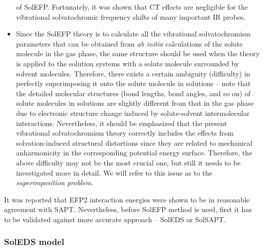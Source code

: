 \documentclass[a4paper,titlepage,twoside,fleqn,12pt]{book}
\begin{document}
\begin{refsection}
\begin{itemize}
of SolEFP. Fortunately,
it was shown that CT effects are negligible for the vibrational solvatochromic frequency shifts 
of many important IR probes.\citep{Lee.Choi.Cho.PCCP.2010,Blasiak.Cho.JCP.2014}
 \item Since the SolEFP theory is to calculate all the vibrational solvatochromism parameters 
that can be obtained from \emph{ab initio} calculations of the solute molecule in the gas phase, 
the same structure should be used when the theory is applied to the solution systems 
with a solute molecule surrounded by solvent molecules. Therefore, there exists a certain 
ambiguity (difficulty) in perfectly superimposing it onto the solute molecule in solutions 
-- note that the detailed molecular structures (bond lengths, bond angles, and so on) 
of solute molecules in solutions are slightly different from that in the gas phase 
due to electronic structure change induced by solute\hyp{}solvent intermolecular interactions. 
Nevertheless, it should be emphasized that the present vibrational solvatochromism theory 
correctly includes the effects from solvation\hyp{}induced structural distortions 
since they are related to mechanical anharmonicity in the corresponding potential 
energy surface. Therefore, the above difficulty may not be the most crucial one, 
but still it needs to be investigated more in detail. We will refer to this issue as to
the \emph{superimposition problem}.
\end{itemize}
%
It was reported that EFP2 interaction energies were shown to be
in reasonable agreement 
with SAPT.\citep{Flick.Kosenkov.Hohenstein.Sherrill.Slipchenko.JCTC.2012} 
Nevertheless, before SolEFP method is used, first it has to be validated
against more accurate approach -- SolEDS or SolSAPT. 

\subsubsection{SolEDS model\label{s:soleds}}


\end{refsection}
\end{document}

